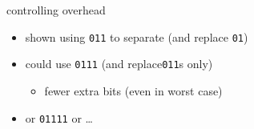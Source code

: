 \begin{frame}{controlling overhead}
\begin{itemize}
\item shown using \texttt{011} to separate (and replace \texttt{01})
\item could use \texttt{0111} (and replace\texttt{011}s only)
	\begin{itemize}
	\item fewer extra bits (even in worst case)
	\end{itemize}
\item or \texttt{01111} or \ldots
\end{itemize}
\end{frame}
